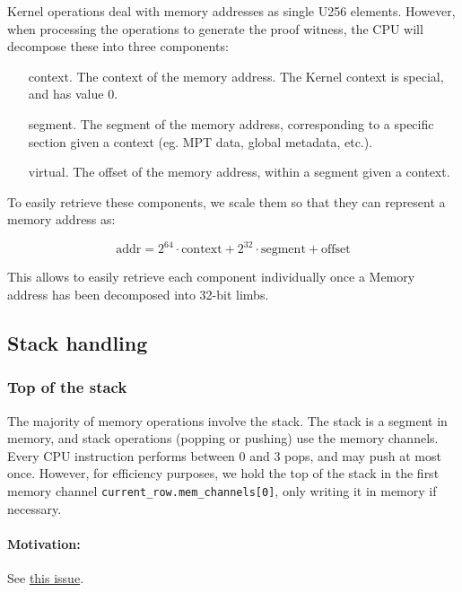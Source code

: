 Kernel operations deal with memory addresses as single U256 elements.
However, when processing the operations to generate the proof witness, the CPU will decompose these into three components:

\begin{itemize}
  \item[context.] The context of the memory address. The Kernel context is special, and has value 0.

  \item[segment.] The segment of the memory address, corresponding to a specific section given a context (eg. MPT data, global metadata, etc.).

  \item[virtual.] The offset of the memory address, within a segment given a context.
\end{itemize}

To easily retrieve these components, we scale them so that they can represent a memory address as:

$$ \mathrm{addr} = 2^{64} \cdot \mathrm{context} + 2^{32} \cdot \mathrm{segment} + \mathrm{offset}$$

This allows to easily retrieve each component individually once a Memory address has been decomposed into 32-bit limbs.


\subsection{Stack handling}
\label{stackhandling}

\subsubsection{Top of the stack}

The majority of memory operations involve the stack. The stack is a segment in memory, and stack operations (popping or pushing) use the memory channels.
Every CPU instruction performs between 0 and 3 pops, and may push at most once. However, for efficiency purposes, we hold the top of the stack in
the first memory channel \texttt{current\_row.mem\_channels[0]}, only writing it in memory if necessary.

\paragraph*{Motivation:}

See \href{https://github.com/0xPolygonZero/plonky2/issues/1149}{this issue}.


